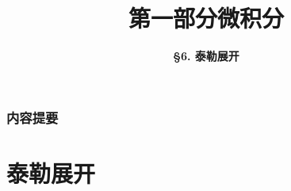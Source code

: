




\title[Calculus]{\LARGE \bfseries 第一部分\quad 微积分} %
\author[Taylor Expansion] %
{\Large \bfseries \S 6. 泰勒展开
}
\date{}



\begin{frame}
\titlepage %
\end{frame}

\begin{frame}
\frametitle{内容提要} %
\tableofcontents %
\end{frame}


\section{泰勒展开}


